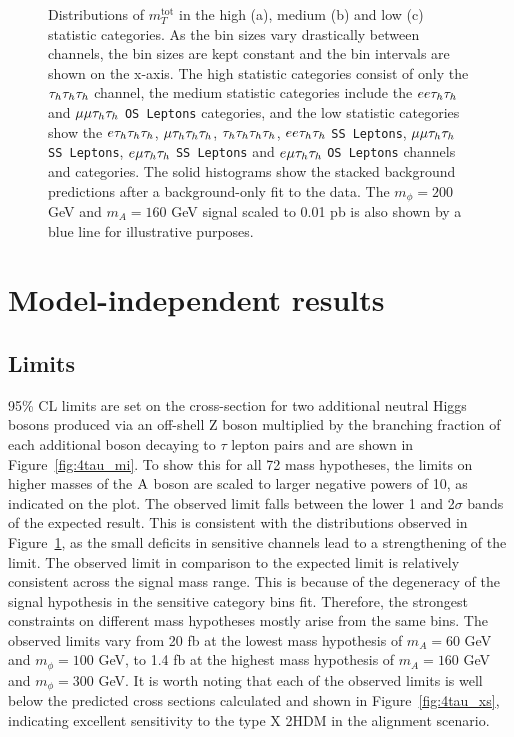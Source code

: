 \begin{figure}[!hbtp]
\caption{Distributions of $m_{T}^\text{tot}$ in the high (a), medium (b) and low (c) statistic categories. As the bin sizes vary drastically between channels, the bin sizes are kept constant and the bin intervals are shown on the x-axis. The high statistic categories consist of only the $\tau_{h}\tau_{h}\tau_{h}$ channel, the medium statistic categories include the $ee\tau_{h}\tau_{h}$ and $\mu\mu\tau_{h}\tau_{h}$ \texttt{OS Leptons} categories, and the low statistic categories show the $e\tau_{h}\tau_{h}\tau_{h}$, $\mu\tau_{h}\tau_{h}\tau_{h}$, $\tau_{h}\tau_{h}\tau_{h}\tau_{h}$,  $ee\tau_{h}\tau_{h}$ \texttt{SS Leptons}, $\mu\mu\tau_{h}\tau_{h}$ \texttt{SS Leptons}, $e\mu\tau_{h}\tau_{h}$ \texttt{SS Leptons} and $e\mu\tau_{h}\tau_{h}$ \texttt{OS Leptons} channels and categories. The solid histograms show the stacked background predictions after a background-only fit to the data. The $m_{\phi}=200$ GeV and $m_{A}=160$ GeV signal scaled to 0.01 pb is also shown by a blue line for illustrative purposes.}
\label{fig:4tau_postfit}
\end{figure}


\section{Model-independent results}

\subsection{Limits}

95\% \ac{CL} limits are set on the cross-section for two additional neutral Higgs bosons produced via an off-shell Z boson multiplied by the branching fraction of each additional boson decaying to $\tau$ lepton pairs and are shown in Figure~\ref{fig:4tau_mi}.
To show this for all 72 mass hypotheses, the limits on higher masses of the ${\text{A}}$ boson are scaled to larger negative powers of 10, as indicated on the plot.
The observed limit falls between the lower 1 and 2$\sigma$ bands of the expected result.
This is consistent with the distributions observed in Figure~\ref{fig:4tau_postfit}, as the small deficits in sensitive channels lead to a strengthening of the limit.
The observed limit in comparison to the expected limit is relatively consistent across the signal mass range.
This is because of the degeneracy of the signal hypothesis in the sensitive category bins fit.
Therefore, the strongest constraints on different mass hypotheses mostly arise from the same bins.
The observed limits vary from 20 fb at the lowest mass hypothesis of $m_A = 60$ GeV and $m_{\phi} = 100$ GeV, to 1.4 fb at the highest mass hypothesis of $m_A = 160$ GeV and $m_{\phi} = 300$ GeV.
It is worth noting that each of the observed limits is well below the predicted cross sections calculated and shown in Figure~\ref{fig:4tau_xs}, indicating excellent sensitivity to the type X \ac{2HDM} in the alignment scenario. \\


